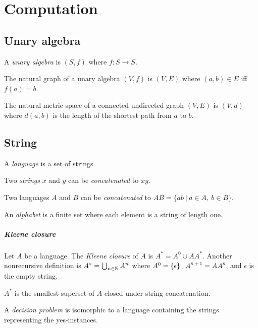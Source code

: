 \chapter{Computation}

\section{Unary algebra}

%
A \emph{unary algebra} is \((S,f)\) where \(f : S \to S\).


The natural graph of a unary algebra \((V,f)\) is \((V,E)\)
where \((a,b) \in E\) iff \(f(a) = b\).

The natural metric space of a connected undirected graph \((V,E)\) is \((V,d)\) where
\(d(a,b)\) is the length of the shortest path from \(a\) to \(b\).

\section{String}

%
A \emph{language} is a set of strings.

Two
%
\emph{strings}
\(x\) and \(y\) can be
%
%
\emph{concatenated} to \(xy\).

Two languages \(A\) and \(B\) can be
%
%
\emph{concatenated} to
\(AB = \{ ab ~|~ a \in A, ~ b \in B \}\).

%
An \emph{alphabet} is a finite set where each element is a string of length one.

\paragraph{Kleene closure}
Let \(A\) be a language.
The
%
%
%
\emph{Kleene closure}
of \(A\) is \(A^* = A^0 \cup AA^*\).
Another nonrecursive definition is
\( A^* = \bigcup_{n \in \mathbb{N}} A^n \)
where \( A^0 = \{\epsilon\} \),
\( A^{n+1} = A A^n \),
and \(\epsilon\) is the
%
%
empty string.

\(A^*\) is the smallest superset of \(A\)
closed under string concatenation.

A \emph{decision problem} is isomorphic to a language
containing the strings representing the yes-instances.

